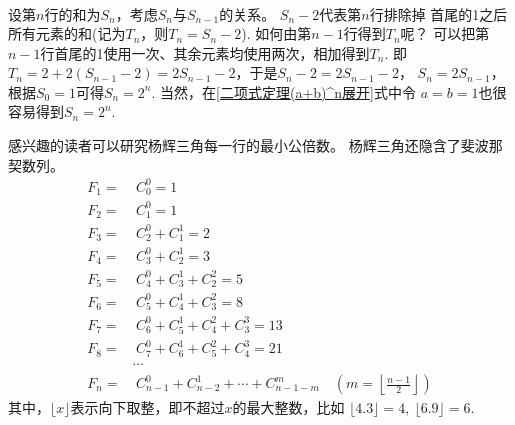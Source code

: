 \begin{itemize}[leftmargin=\inteval{\myitemleftmargin}pt,itemsep=
   \inteval{\myitemitempsep}pt,topsep=\inteval{\myitemtopsep}pt]
{\begin{gather*}
\end{gather*}  }
设第$n$行的和为$S_n$，考虑$S_n$与$S_{n-1}$的关系。 $S_n-2$代表第$n$行排除掉
首尾的1之后所有元素的和(记为$T_n$，则$T_n=S_n-2$). 
如何由第$n-1$行得到$T_n$呢？
可以把第$n-1$行首尾的1使用一次、其余元素均使用两次，相加得到$T_n$.
即 $T_n=2+2(S_{n-1}-2)=2S_{n-1}-2$，于是$ S_n-2=2S_{n-1}-2 $，
$ S_n=2S_{n-1} $，根据$S_0=1$可得$S_n=2^n$. 
当然，在\eqref{二项式定理(a+b)^n展开}式中令
$a=b=1$也很容易得到$S_n=2^n$. 

感兴趣的读者可以研究杨辉三角每一行的最小公倍数。
杨辉三角还隐含了斐波那契数列。
\begin{align*}
    F_1=&\  C_0^0=1 \\
    F_2=&\  C_1^0=1 \\
    F_3=&\  C_2^0+C_1^1=2 \\
    F_4=&\  C_3^0+C_2^1=3 \\
    F_5=&\  C_4^0+C_3^1+C_2^2=5 \\
    F_6=&\  C_5^0+C_4^1+C_3^2=8 \\
    F_7=&\  C_6^0+C_5^1+C_4^2+C_3^3=13 \\
    F_8=&\  C_7^0+C_6^1+C_5^2+C_4^3=21 \\ 
    &\cdots \\
    F_n=&\  C_{n-1}^0+C_{n-2}^1+\cdots+C_{n-1-m}^m\quad \left(m=\left\lfloor
    \frac{n-1}{2} \right\rfloor\right)   
\end{align*}
其中，$ \lfloor x \rfloor $表示向下取整，即不超过$ x $的最大整数，比如
$ \lfloor 4.3 \rfloor=4,\ \lfloor 6.9 \rfloor=6 $. 


\end{itemize}
